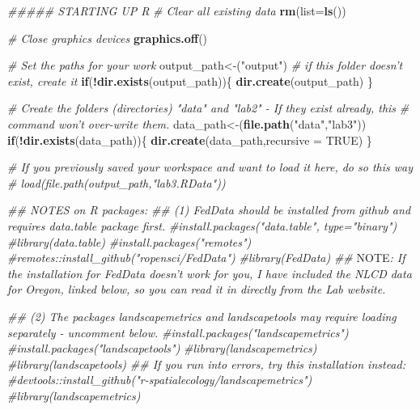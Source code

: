 \documentclass[
]{article}
\newenvironment{Shaded}{\begin{snugshade}}{\end{snugshade}}
\newcommand{\AlertTok}[1]{\textcolor[rgb]{0.94,0.16,0.16}{#1}}
\newcommand{\CommentTok}[1]{\textcolor[rgb]{0.56,0.35,0.01}{\textit{#1}}}
\newcommand{\ControlFlowTok}[1]{\textcolor[rgb]{0.13,0.29,0.53}{\textbf{#1}}}
\newcommand{\DataTypeTok}[1]{\textcolor[rgb]{0.13,0.29,0.53}{#1}}
\newcommand{\KeywordTok}[1]{\textcolor[rgb]{0.13,0.29,0.53}{\textbf{#1}}}
\newcommand{\NormalTok}[1]{#1}
\newcommand{\OperatorTok}[1]{\textcolor[rgb]{0.81,0.36,0.00}{\textbf{#1}}}
\newcommand{\OtherTok}[1]{\textcolor[rgb]{0.56,0.35,0.01}{#1}}
\newcommand{\StringTok}[1]{\textcolor[rgb]{0.31,0.60,0.02}{#1}}
\begin{document}
\begin{Shaded}
\begin{Highlighting}[]
\CommentTok{##### STARTING UP R}
\CommentTok{# Clear all existing data}
\KeywordTok{rm}\NormalTok{(}\DataTypeTok{list=}\KeywordTok{ls}\NormalTok{())}

\CommentTok{# Close graphics devices}
\KeywordTok{graphics.off}\NormalTok{()}

\CommentTok{# Set the paths for your work}
\NormalTok{output_path<-(}\StringTok{"output"}\NormalTok{)}
\CommentTok{# if this folder doesn't exist, create it}
\ControlFlowTok{if}\NormalTok{(}\OperatorTok{!}\KeywordTok{dir.exists}\NormalTok{(output_path))\{}
  \KeywordTok{dir.create}\NormalTok{(output_path)}
\NormalTok{\}}

\CommentTok{# Create the folders (directories) "data" and "lab2" - If they exist already, this }
\CommentTok{# command won't over-write them.}
\NormalTok{data_path<-(}\KeywordTok{file.path}\NormalTok{(}\StringTok{"data"}\NormalTok{,}\StringTok{"lab3"}\NormalTok{))}
\ControlFlowTok{if}\NormalTok{(}\OperatorTok{!}\KeywordTok{dir.exists}\NormalTok{(data_path))\{}
  \KeywordTok{dir.create}\NormalTok{(data_path,}\DataTypeTok{recursive =} \OtherTok{TRUE}\NormalTok{)}
\NormalTok{\}}

\CommentTok{# If you previously saved your workspace and want to load it here, do so this way }
\CommentTok{# load(file.path(output_path,"lab3.RData"))}
     
\CommentTok{## NOTES on R packages:}
\CommentTok{## (1) FedData should be installed from github and requires data.table package first. }
\CommentTok{#install.packages("data.table", type="binary")}
\CommentTok{#library(data.table)}
\CommentTok{#install.packages("remotes")}
\CommentTok{#remotes::install_github("ropensci/FedData")}
\CommentTok{#library(FedData)}
\CommentTok{## }\AlertTok{NOTE}\CommentTok{: If the installation for FedData doesn't work for you, I have included the NLCD data for Oregon, linked below, so you can read it in directly from the Lab website.}

\CommentTok{## (2) The packages landscapemetrics and landscapetools may require loading separately - uncomment below.}
\CommentTok{#install.packages("landscapemetrics")}
\CommentTok{#install.packages("landscapetools")}
\CommentTok{#library(landscapemetrics)}
\CommentTok{#library(landscapetools)}
\CommentTok{## If you run into errors, try this installation instead:}
\CommentTok{#devtools::install_github("r-spatialecology/landscapemetrics")}
\CommentTok{#library(landscapemetrics)}


\end{Highlighting}
\end{Shaded}
\end{document}
